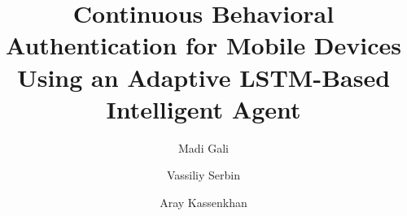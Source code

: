 \documentclass[3p,times,procedia]{elsarticle}
\begin{document}
\begin{frontmatter}

%

\title{Continuous Behavioral Authentication for Mobile Devices
Using an Adaptive LSTM-Based Intelligent Agent}

\author[a]{Madi Gali}
\author[b]{Vassiliy Serbin}
\author[c]{Aray Kassenkhan}

\address[a]{Department of Cybersecurity, Institute of Automation and
Information Technologies, Satbayev University, Almaty 050013,
Kazakhstan}
\address[b]{Department of Information Systems, Institute of
Automation and Information Technologies, Satbayev University,
Almaty 050013, Kazakhstan}
\address[c]{Department of Software Engineering, Institute of
Automation and Information Technologies, Satbayev University,
Almaty 050013, Kazakhstan}


\end{frontmatter}
\end{document}
